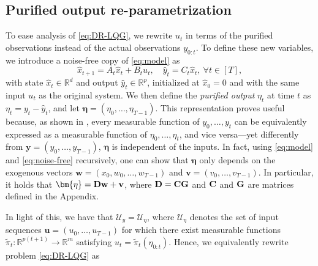 \documentclass[letterpaper, 10 pt, conference]{ieeeconf}  %
\theoremstyle{ieeeconf}
\newcommand{\R}{\mathbb{R}}
\begin{document}
\subsection{Purified output re-parametrization}
\label{sec:purified-output}
To ease analysis of \eqref{eq:DR-LQG}, we rewrite $u_t$ in terms of the purified observations instead of the actual observations $y_{0:t}$. To define these new variables, we introduce a noise-free copy of \eqref{eq:model} as
\begin{equation}
    \hat{x}_{t+1} = A_t \hat{x}_{t}+B_t u_{t},\quad \hat{y}_{t} = C_t \hat{x}_{t},~ \forall t\in[T],
    \label{eq:noise-free}
\end{equation}
with state $\hat{x}_t\in\R^d$ and output $\hat{y}_t\in\R^p$, initialized at $\hat{x}_0=0$ and with the same input $u_t$ as the 
original system. We then define the \emph{purified output} $\eta_t$ at time \( t \) as \( \eta_t = y_t - \hat{y}_t \), and let \( \bm{\eta} = (\eta_0, \dots, \eta_{T-1}) \). This representation proves useful because, as shown in 
 \cite[Proposition II.1]{hadjiyiannis2011efficient}, every measurable function of \( y_0, \dots, y_t \) can be equivalently expressed as a measurable function of \( \eta_0, \dots, \eta_t \), and vice versa—yet differently from $\mathbf{y} = (y_0, \dots, y_{T-1})$, \(\bm\eta\) is independent of the inputs. In fact, using \eqref{eq:model} and \eqref{eq:noise-free} recursively, one can show that \(\bm\eta\) only depends on the exogenous vectors $\mathbf{w} = (x_0, w_0, \dots, 
w_{T-1})$ and $\mathbf{v} = (v_0, \dots, v_{T-1})$. In particular, it holds that $\bf \bm{\eta} = D w + v$, where $\bf D = CG$ and $\bf C$ and $\bf G$ are matrices defined in the Appendix. 

In light of this, we have that \( \mathcal{U}_y = \mathcal{U}_\eta \), where \( \mathcal{U}_\eta \) denotes the set of input sequences \( \mathbf{u} = (u_0, \dots, u_{T-1}) \) for which there exist measurable functions \( \tilde{\pi}_t: \mathbb{R}^{p(t+1)} \to \mathbb{R}^m \) satisfying \( u_t = \tilde{\pi}_t(\eta_{0:t}) \). Hence, we equivalently rewrite problem \eqref{eq:DR-LQG} as
\end{document}
